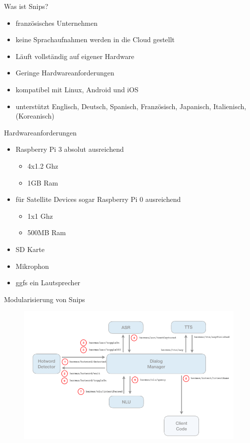 \documentclass[aspectratio=169]{beamer}
\begin{document}
\begin{frame}{Was ist Snips?}
	\begin{itemize}
		\item französisches Unternehmen
		\item keine Sprachaufnahmen werden in die Cloud gestellt
		\item Läuft vollständig auf eigener Hardware
		\item Geringe Hardwareanforderungen
		\item kompatibel mit Linux, Android und iOS
		\item unterstützt Englisch, Deutsch, Spanisch, Französisch, Japanisch, Italienisch, (Koreanisch)
	\end{itemize}
\end{frame}

\begin{frame}{Hardwareanforderungen}
	\begin{itemize}
		\item Raspberry Pi 3 absolut ausreichend
		\begin{itemize}
			\item 4x1.2 Ghz
			\item 1GB Ram
		\end{itemize}
	    \item für Satellite Devices sogar Raspberry Pi 0 ausreichend
	    \begin{itemize}
	    	\item 1x1 Ghz
	    	\item 500MB Ram
	    \end{itemize}
        \item SD Karte
        \item Mikrophon
        \item ggfs ein Lautsprecher
	\end{itemize}
\end{frame}

\begin{frame}{Modularisierung von Snips}
	\begin{figure}
		\includegraphics[scale=0.4]{images/mqtt-snips}
	\end{figure}
\end{frame}
\end{document}
